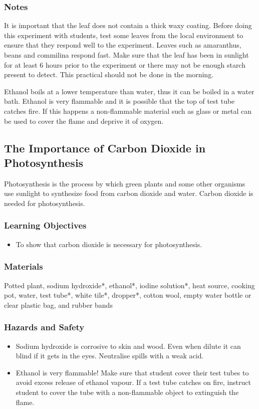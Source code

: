 \subsubsection*{Notes}
It is important that the leaf does not contain a thick waxy coating. Before doing this experiment with students, test some leaves from the local environment to ensure that they respond well to the experiment. Leaves such as amaranthus, beans and commilina respond fast. Make sure that the leaf has been in sunlight for at least 6 hours prior to the experiment or there may not be enough starch present to detect. This practical should not be done in the morning.

Ethanol boils at a lower temperature than water, thus it can be boiled in a water bath. Ethanol is very flammable and it is possible that the top of test tube catches fire. If this happens a non-flammable material such as glass or metal can be used to cover the flame and deprive it of oxygen.

\subsection{The Importance of Carbon Dioxide in Photosynthesis}
Photosynthesis is the process by which green plants and some other organisms use sunlight to synthesize food from carbon dioxide and water. Carbon dioxide is needed for photosynthesis.

\subsubsection*{Learning Objectives}
\begin{itemize}
\item{To show that carbon dioxide is necessary for photosynthesis.}
\end{itemize}

\subsubsection*{Materials}
Potted plant, sodium hydroxide*, ethanol*, iodine solution*, heat source, cooking pot, water, test tube*, white tile*, dropper*, cotton wool, empty water bottle or clear plastic bag, and rubber bands

\subsubsection*{Hazards and Safety}
\begin{itemize}
\item{Sodium hydroxide is corrosive to skin and wood. Even when dilute it can blind if it gets in the eyes. Neutralise spills with a weak acid.}
\item{Ethanol is very flammable! Make sure that student cover their test tubes to avoid excess release of ethanol vapour. If a test tube catches on fire, instruct student to cover the tube with a non-flammable object to extinguish the flame.}
\end{itemize}

